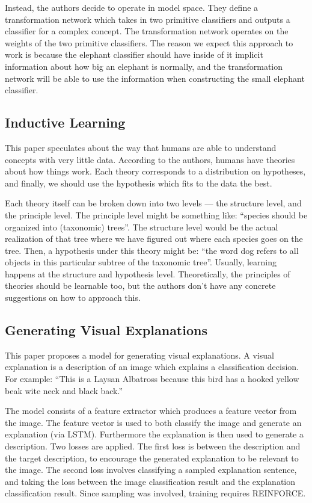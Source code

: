 \documentclass[12pt]{article}
\begin{document}
Instead, the authors decide to operate in model space. They define a transformation network which takes in two primitive classifiers and outputs a classifier for a complex concept. The transformation network operates on the weights of the two primitive classifiers. The reason we expect this approach to work is because the elephant classifier should have inside of it implicit information about how big an elephant is normally, and the transformation network will be able to use the information when constructing the small elephant classifier.

\subsection{Inductive Learning \cite{InductiveLearning}}

This paper speculates about the way that humans are able to understand concepts with very little data. According to the authors, humans have theories about how things work. Each theory corresponds to a distribution on hypotheses, and finally, we should use the hypothesis which fits to the data the best.

Each theory itself can be broken down into two levels — the structure level, and the principle level. The principle level might be something like: ``species should be organized into (taxonomic) trees''. The structure level would be the actual realization of that tree where we have figured out where each species goes on the tree. Then, a hypothesis under this theory might be: ``the word dog refers to all objects in this particular subtree of the taxonomic tree''. Usually, learning happens at the structure and hypothesis level. Theoretically, the principles of theories should be learnable too, but the authors don’t have any concrete suggestions on how to approach this. 

\subsection{Generating Visual Explanations \cite{VisualExplanations}}

This paper proposes a model for generating visual explanations. A visual explanation is a description of an image which explains a classification decision. For example: ``This is a Laysan Albatross because this bird has a hooked yellow beak wite neck and black back.''

The model consists of a feature extractor which produces a feature vector from the image. The feature vector is used to both classify the image and generate an explanation (via LSTM). Furthermore the explanation is then used to generate a description. Two losses are applied. The first loss is between the description and the target description, to encourage the generated explanation to be relevant to the image. The second loss involves classifying a sampled explanation sentence, and taking the loss between the image classification result and the explanation classification result. Since sampling was involved, training requires REINFORCE.
\end{document}
